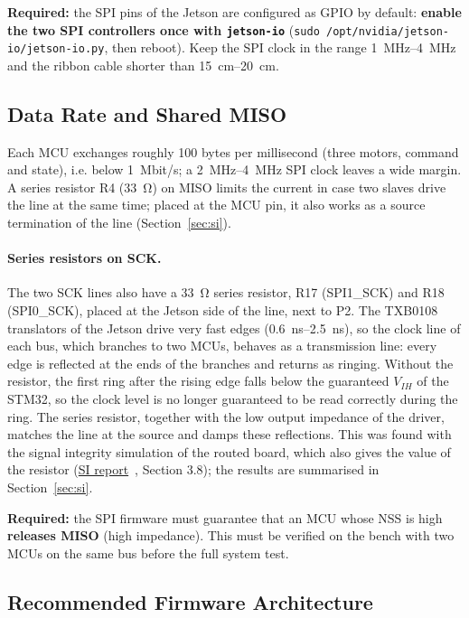 \documentclass[11pt,a4paper]{article}
\newcommand{\required}[1]{\begin{reqbox}\textbf{\color{reqred}Required:} #1\end{reqbox}}
\newcommand{\sireport}{\href{run:BYTE_SPIne_SI_Simulation.pdf}{SI report}~\cite{si}}
\begin{document}
\required{the SPI pins of the Jetson are configured as GPIO by default: \textbf{enable the two
SPI controllers once with \texttt{jetson-io}} (\texttt{sudo /opt/nvidia/jetson-io/jetson-io.py},
then reboot). Keep the SPI clock in the range \qtyrange{1}{4}{MHz} and the ribbon cable shorter
than \qtyrange{15}{20}{cm}.}

\subsection{Data Rate and Shared MISO}\label{sec:miso}

Each MCU exchanges roughly 100 bytes per millisecond (three motors, command and state), i.e.
below \qty{1}{Mbit/s}; a \qtyrange[range-phrase=--, range-units=single]{2}{4}{MHz} SPI clock leaves a wide margin. A series resistor R4 (\qty{33}{\ohm}) on MISO
limits the current in case two slaves drive the line at the same time; placed at the MCU pin, it
also works as a source termination of the line (Section~\ref{sec:si}).

\paragraph{Series resistors on SCK.} The two SCK lines also have a \qty{33}{\ohm} series resistor, R17 (SPI1\_SCK)
and R18 (SPI0\_SCK), placed at the Jetson side of the line, next to P2. The TXB0108 translators
of the Jetson drive very fast edges (\qtyrange{0.6}{2.5}{ns}), so the clock line of each bus, which branches
to two MCUs, behaves as a transmission line: every edge is reflected at the ends of the branches
and returns as ringing. Without the resistor, the first ring after the rising edge falls below the
guaranteed $V_{IH}$ of the STM32, so the clock level is no longer guaranteed to be read correctly
during the ring. The series resistor, together with the low output impedance of the driver,
matches the line at the source and damps these reflections. This was found with the signal
integrity simulation of the routed board, which also gives the value of the resistor (\sireport,
Section 3.8); the results are summarised in Section~\ref{sec:si}.

\required{the SPI firmware must guarantee that an MCU whose NSS is high \textbf{releases
MISO} (high impedance). This must be verified on the bench with two MCUs on the same
bus before the full system test.}

\subsection{Recommended Firmware Architecture}\label{sec:fwarch}
\end{document}
